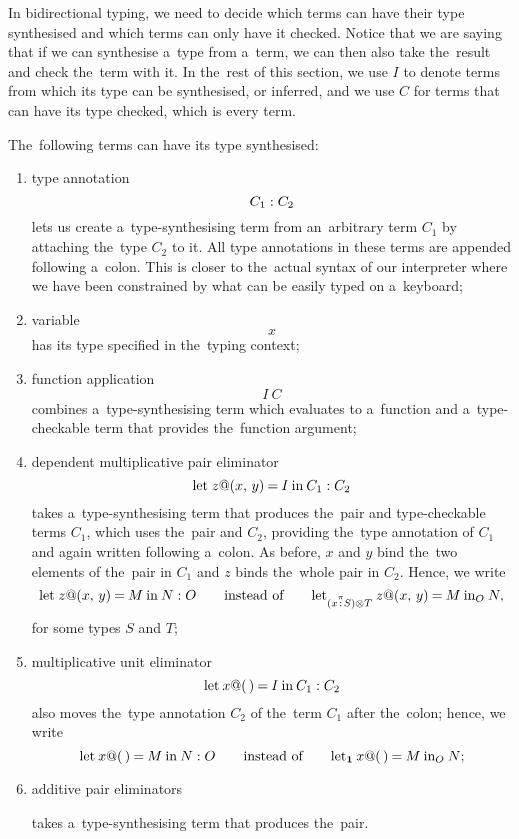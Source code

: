 In bidirectional typing, we need to decide which terms can have their type
synthesised and which terms can only have it checked. Notice that we are saying
that if we can synthesise a~type from a~term, we can then also take the~result
and check the~term with it. In the~rest of this section, we use $I$ to denote
terms from which its type can be synthesised, or inferred, and we use $C$ for
terms that can have its type checked, which is every term.

The~following terms can have its type synthesised:
\begin{enumerate}
  \item type annotation
    \[
      C_1 \overset{}: C_2
    \]
    lets us create a~type-synthesising term from an~arbitrary term $C_1$ by
    attaching the~type $C_2$ to it. All type annotations in these terms are
    appended following a~colon. This is closer to the~actual syntax of our
    interpreter where we have been constrained by what can be easily typed on
    a~keyboard;
  \item variable
    \[
      x
    \]
    has its type specified in the~typing context;
  \item function application
    \[
      I \: C
    \]
    combines a~type-synthesising term which evaluates to a~function and
    a~type-checkable term that provides the~function argument;
  \item dependent multiplicative pair eliminator
    \[
      \letpair {} [z] x y I {C_1} \is{} C_2
    \]
    takes a~type-synthesising term that produces the~pair and type-checkable
    terms $C_1$, which uses the~pair and $C_2$, providing the~type annotation of
    $C_1$ and again written following a~colon. As before, $x$ and $y$ bind
    the~two elements of the~pair in $C_1$ and $z$ binds the~whole pair in $C_2$.
    Hence, we write
    \[
      \letpair {} [z] x y M N \is{} O \qquad \text{instead of} \qquad
        \letpair {(x \is\pi S) \otimes T} [z] x y M [O] N,
    \]
    for some types $S$ and $T$;
  \item multiplicative unit eliminator
    \[
      \letu* [x] I {C_1} \is{} C_2
    \]
    also moves the~type annotation $C_2$ of the~term $C_1$ after the~colon;
    hence, we write
    \[
      \letu* [x] M N \is{} O \qquad \text{instead of} \qquad
        \letu [x] M [O] N;
    \]
  \item additive pair eliminators
    takes a~type-synthesising term that produces the~pair.
\end{enumerate}

